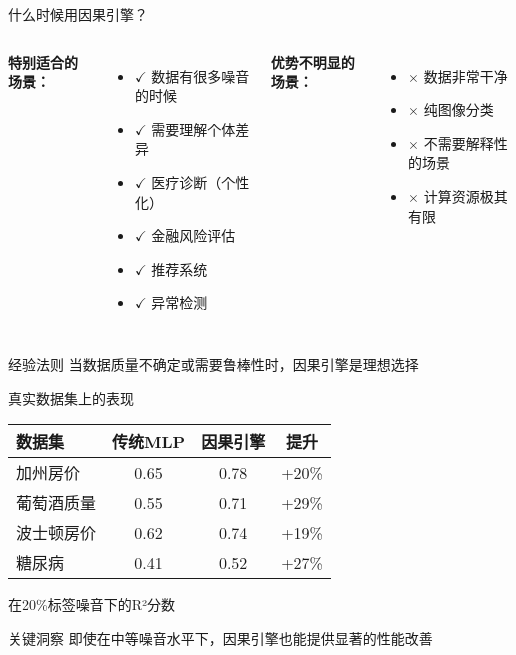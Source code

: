 \documentclass[aspectratio=169,12pt]{beamer}
\begin{document}
\begin{frame}{什么时候用因果引擎？}
\begin{columns}
\textbf{特别适合的场景：}
\begin{itemize}
    \item $\checkmark$ 数据有很多噪音的时候
    \item $\checkmark$ 需要理解个体差异
    \item $\checkmark$ 医疗诊断（个性化）
    \item $\checkmark$ 金融风险评估
    \item $\checkmark$ 推荐系统
    \item $\checkmark$ 异常检测
\end{itemize}

\textbf{优势不明显的场景：}
\begin{itemize}
    \item $\times$ 数据非常干净
    \item $\times$ 纯图像分类
    \item $\times$ 不需要解释性的场景
    \item $\times$ 计算资源极其有限
\end{itemize}
\end{columns}

\vspace{1em}
\begin{block}{经验法则}
当数据质量不确定或需要鲁棒性时，因果引擎是理想选择
\end{block}
\end{frame}

\begin{frame}{真实数据集上的表现}
\begin{table}
\centering
\begin{tabular}{|l|c|c|c|}
\hline
\textbf{数据集} & \textbf{传统MLP} & \textbf{因果引擎} & \textbf{提升} \\
\hline
加州房价 & 0.65 & 0.78 & +20\% \\
葡萄酒质量 & 0.55 & 0.71 & +29\% \\
波士顿房价 & 0.62 & 0.74 & +19\% \\
糖尿病 & 0.41 & 0.52 & +27\% \\
\hline
\end{tabular}
\end{table}
{\footnotesize *在20\%标签噪音下的R²分数}

\vspace{1em}
\begin{alertblock}{关键洞察}
即使在中等噪音水平下，因果引擎也能提供显著的性能改善
\end{alertblock}
\end{frame}
\end{document}
